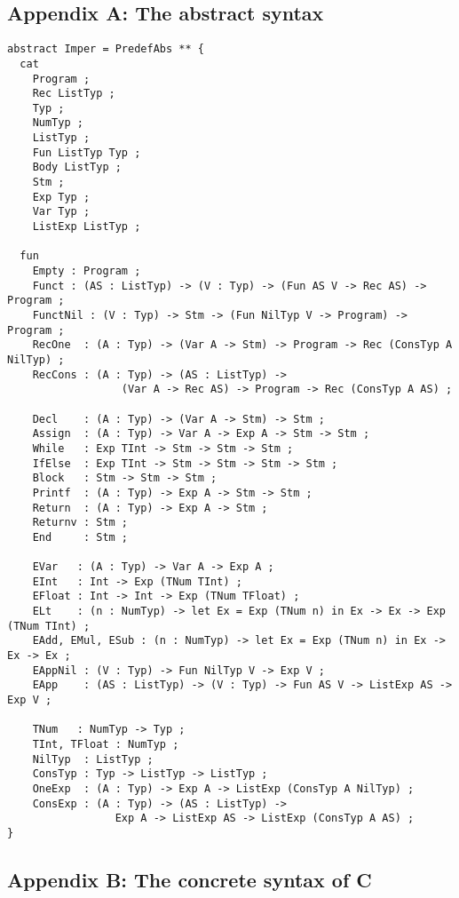 \documentclass[12pt]{article}
\begin{document}





\newpage
\subsection*{Appendix A: The abstract syntax}

\small
\begin{verbatim}
abstract Imper = PredefAbs ** {
  cat
    Program ;
    Rec ListTyp ;
    Typ ;
    NumTyp ;
    ListTyp ;
    Fun ListTyp Typ ;
    Body ListTyp ;
    Stm ;
    Exp Typ ;
    Var Typ ;
    ListExp ListTyp ;

  fun
    Empty : Program ;
    Funct : (AS : ListTyp) -> (V : Typ) -> (Fun AS V -> Rec AS) -> Program ;
    FunctNil : (V : Typ) -> Stm -> (Fun NilTyp V -> Program) -> Program ;
    RecOne  : (A : Typ) -> (Var A -> Stm) -> Program -> Rec (ConsTyp A NilTyp) ;
    RecCons : (A : Typ) -> (AS : ListTyp) -> 
                  (Var A -> Rec AS) -> Program -> Rec (ConsTyp A AS) ;

    Decl    : (A : Typ) -> (Var A -> Stm) -> Stm ;
    Assign  : (A : Typ) -> Var A -> Exp A -> Stm -> Stm ;
    While   : Exp TInt -> Stm -> Stm -> Stm ;
    IfElse  : Exp TInt -> Stm -> Stm -> Stm -> Stm ;
    Block   : Stm -> Stm -> Stm ;
    Printf  : (A : Typ) -> Exp A -> Stm -> Stm ;
    Return  : (A : Typ) -> Exp A -> Stm ;
    Returnv : Stm ;
    End     : Stm ;

    EVar   : (A : Typ) -> Var A -> Exp A ;
    EInt   : Int -> Exp (TNum TInt) ;
    EFloat : Int -> Int -> Exp (TNum TFloat) ;
    ELt    : (n : NumTyp) -> let Ex = Exp (TNum n) in Ex -> Ex -> Exp (TNum TInt) ;
    EAdd, EMul, ESub : (n : NumTyp) -> let Ex = Exp (TNum n) in Ex -> Ex -> Ex ;
    EAppNil : (V : Typ) -> Fun NilTyp V -> Exp V ;
    EApp    : (AS : ListTyp) -> (V : Typ) -> Fun AS V -> ListExp AS -> Exp V ;

    TNum   : NumTyp -> Typ ;  
    TInt, TFloat : NumTyp ;
    NilTyp  : ListTyp ;
    ConsTyp : Typ -> ListTyp -> ListTyp ;
    OneExp  : (A : Typ) -> Exp A -> ListExp (ConsTyp A NilTyp) ;
    ConsExp : (A : Typ) -> (AS : ListTyp) -> 
                 Exp A -> ListExp AS -> ListExp (ConsTyp A AS) ;
}
\end{verbatim}
\normalsize
\newpage


\subsection*{Appendix B: The concrete syntax of C}
\end{document}
